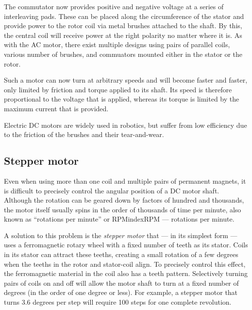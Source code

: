 
The commutator now provides positive and negative voltage at a series of interleaving pads. These can be placed along the circumference of the stator and provide power to the rotor coil via metal brushes attached to the shaft. By this, the central coil will receive power at the right polarity no matter where it is. As with the AC motor, there exist multiple designs using pairs of parallel coils, various number of brushes, and commuators mounted either in the stator or the rotor.

Such a motor can now turn at arbitrary speeds and will become faster and faster, only limited by friction and torque applied to its shaft. Its speed is therefore proportional to the voltage that is applied, whereas its torque is limited by the maximum current that is provided. 

Electric DC motors are widely used in robotics, but suffer from low efficiency due to the friction of the brushes and their tear-and-wear. 

\subsection{Stepper motor}
Even when using more than one coil and multiple pairs of permanent magnets, it is difficult to precisely control the angular position of a DC motor shaft. Although the rotation can be geared down by factors of hundred and thousands, the motor itself usually spins in the order of thousands of time per minute, also known as ``rotations per minute'' or RPMindex{RPM --- rotations per minute}.

A solution to this problem is the \emph{stepper motor} that --- in its simplest form --- uses a ferromagnetic rotary wheel with a fixed number of teeth as its stator. Coils in its stator can attract these teeths, creating a small rotation of a few degrees when the teeths in the rotor and stator-coil align. To precisely control this effect, the ferromagnetic material in the coil also has a teeth pattern. Selectively turning pairs of coils on and off will allow the motor shaft to turn at a fixed number of degrees (in the order of one degree or less). For example, a stepper motor that turns 3.6 degrees per step will require 100 steps for one complete revolution.

